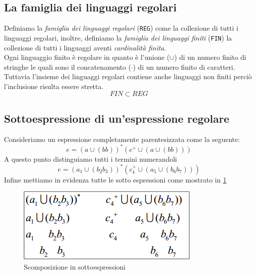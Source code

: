 \subsection{La famiglia dei linguaggi regolari}
Definiamo la \emph{famiglia dei linguaggi regolari} (\texttt{REG}) come la collezione di tutti i linguaggi regolari, inoltre, definiamo la \emph{famiglia dei linguaggi finiti} (\texttt{FIN}) la collezione di tutti i linguaggi aventi \emph{cardinalità finita}.\\
Ogni linguaggio finito è regolare in quanto è l'unione ($ \cup $) di un numero finito di stringhe le quali sono il concatenamento ($ \cdot $) di un numero finito di caratteri. Tuttavia l'insieme dei linguaggi regolari contiene anche linguaggi non finiti perciò l'inclusione risulta essere stretta.
$$FIN\subset REG$$
\subsection{Sottoespressione di un'espressione regolare}
Consideriamo un espressione completamente parentesizzata come la seguente:
$$e = (a \cup (bb))^\ast(c^+\cup(a \cup (bb)))$$
A questo punto distinguiamo tutti i termini numerandoli
$$e = (a_1 \cup (b_2b_3))^\ast(c_4^+\cup(a_5 \cup (b_6b_7)))$$
Infine mettiamo in evidenza tutte le sotto espressioni come mostrato in \figurename\ref{fig:scompo}
\begin{figure}
	\centering
	\includegraphics[width=0.5\linewidth]{img/scompo.png}
	\caption{Scomposizione in sottoespressioni}\label{fig:scompo}
\end{figure}
